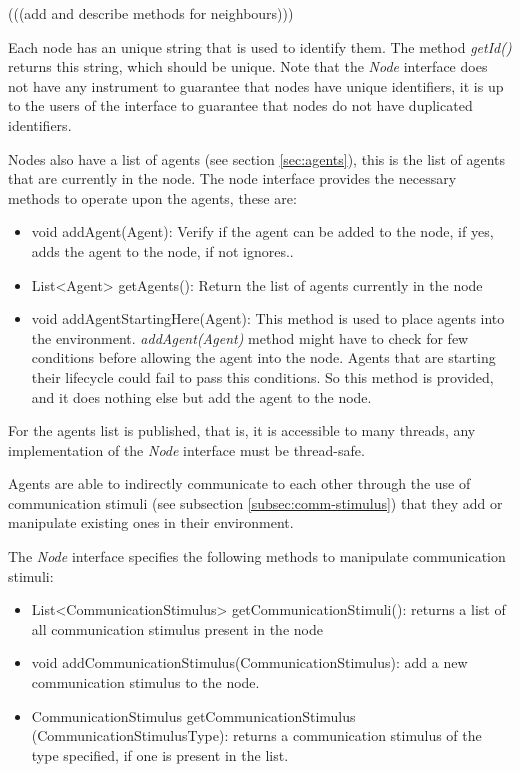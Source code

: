 (((add and describe methods for neighbours)))

Each node has an unique string that is used to identify them. The method \emph{getId()} returns this string, which should be unique. Note that the \emph{Node} interface does not have any instrument to guarantee that nodes have unique identifiers, it is up to the users of the interface to guarantee that nodes do not have duplicated identifiers. 

Nodes also have a list of agents (see section \ref{sec:agents}), this is the list of agents that are currently in the node. The node interface provides the necessary methods to operate upon the agents, these are:

\begin{itemize}
  \item void addAgent(Agent): Verify if the agent can be added to the node, if yes, adds the agent to the node, if not ignores..
  \item List<Agent> getAgents(): Return the list of agents currently in the node
  \item void addAgentStartingHere(Agent): This method is used to place agents into the environment. \emph{addAgent(Agent)} method might have to check for few conditions before allowing the agent into the node. Agents that are starting their lifecycle could fail to pass this conditions. So this method is provided, and it does nothing else but add the agent to the node.
\end{itemize}

For the agents list is published, that is, it is accessible to many threads, any implementation of the \emph{Node} interface must be thread-safe.

Agents are able to indirectly communicate to each other through the use of communication stimuli (see subsection \ref{subsec:comm-stimulus}) that they add or manipulate existing ones in their environment.

The \emph{Node} interface specifies the following methods to manipulate communication stimuli:

\begin{itemize}
  \item List<CommunicationStimulus> getCommunicationStimuli(): returns a list of all communication stimulus present in the node
  
  \item void addCommunicationStimulus(CommunicationStimulus): add a new communication stimulus to the node.
  
  \item CommunicationStimulus getCommunicationStimulus (CommunicationStimulusType): returns a communication stimulus of the type specified, if one is present in the list.
\end{itemize}

